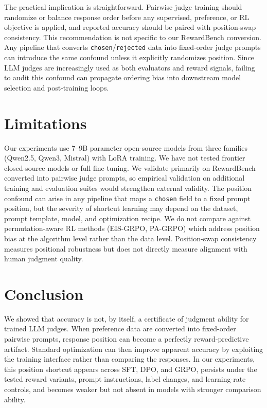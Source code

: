 \documentclass[letterpaper]{article}
\begin{document}
The practical implication is straightforward. Pairwise judge training should randomize or balance response order before any supervised, preference, or RL objective is applied, and reported accuracy should be paired with position-swap consistency. This recommendation is not specific to our RewardBench conversion. Any pipeline that converts \texttt{chosen}/\texttt{rejected} data into fixed-order judge prompts can introduce the same confound unless it explicitly randomizes position. Since LLM judges are increasingly used as both evaluators and reward signals, failing to audit this confound can propagate ordering bias into downstream model selection and post-training loops.

\section*{Limitations}

Our experiments use 7--9B parameter open-source models from three families (Qwen2.5, Qwen3, Mistral) with LoRA training. We have not tested frontier closed-source models or full fine-tuning. We validate primarily on RewardBench converted into pairwise judge prompts, so empirical validation on additional training and evaluation suites would strengthen external validity. The position confound can arise in any pipeline that maps a \texttt{chosen} field to a fixed prompt position, but the severity of shortcut learning may depend on the dataset, prompt template, model, and optimization recipe. We do not compare against permutation-aware RL methods (EIS-GRPO, PA-GRPO) which address position bias at the algorithm level rather than the data level. Position-swap consistency measures positional robustness but does not directly measure alignment with human judgment quality.

\section{Conclusion}

We showed that accuracy is not, by itself, a certificate of judgment ability for trained LLM judges. When preference data are converted into fixed-order pairwise prompts, response position can become a perfectly reward-predictive artifact. Standard optimization can then improve apparent accuracy by exploiting the training interface rather than comparing the responses. In our experiments, this position shortcut appears across SFT, DPO, and GRPO, persists under the tested reward variants, prompt instructions, label changes, and learning-rate controls, and becomes weaker but not absent in models with stronger comparison ability.
\end{document}
